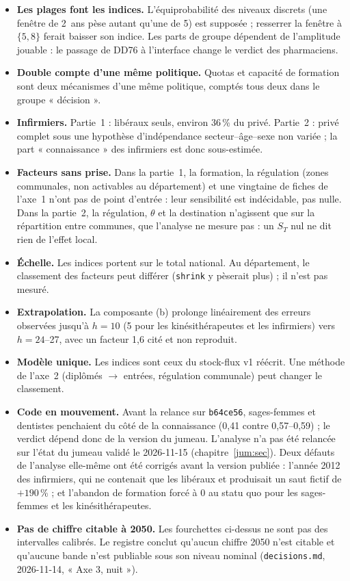 \begin{itemize}
  \item \textbf{Les plages font les indices.} L'équiprobabilité des niveaux discrets (une fenêtre de 2~ans pèse
        autant qu'une de 5) est supposée ; resserrer la fenêtre à $\{5, 8\}$ ferait baisser son indice. Les parts
        de groupe dépendent de l'amplitude jouable : le passage de DD76 à l'interface change le verdict des
        pharmaciens.
  \item \textbf{Double compte d'une même politique.} Quotas et capacité de formation sont deux mécanismes d'une même
        politique, comptés tous deux dans le groupe « décision ».
  \item \textbf{Infirmiers.} Partie~1 : libéraux seuls, environ 36\derive{}\,\% du privé. Partie~2 : privé complet
        sous une hypothèse d'indépendance secteur--âge--sexe non variée ; la part « connaissance » des infirmiers est
        donc sous-estimée.
  \item \textbf{Facteurs sans prise.} Dans la partie~1, la formation, la régulation (zones communales, non
        activables au département) et une vingtaine de fiches de l'axe~1 n'ont pas de point d'entrée : leur
        sensibilité est indécidable, pas nulle. Dans la partie~2, la régulation, $\theta$ et la destination n'agissent
        que sur la répartition entre communes, que l'analyse ne mesure pas : un $S_T$ nul ne dit rien de l'effet
        local.
  \item \textbf{Échelle.} Les indices portent sur le total national. Au département, le classement des facteurs
        peut différer (\texttt{shrink} y pèserait plus) ; il n'est pas mesuré.
  \item \textbf{Extrapolation.} La composante (b) prolonge linéairement des erreurs observées jusqu'à $h = 10$ (5 pour
        les kinésithérapeutes et les infirmiers) vers $h = 24$--27, avec un facteur 1,6 cité et non reproduit.
  \item \textbf{Modèle unique.} Les indices sont ceux du stock-flux v1 réécrit. Une méthode de l'axe~2 (diplômés
        $\to$ entrées, régulation communale) peut changer le classement.
  \item \textbf{Code en mouvement.} Avant la relance sur \texttt{b64ce56}, sages-femmes et dentistes penchaient du
        côté de la connaissance (0,41 contre 0,57--0,59\mesure{}) ; le verdict dépend donc de la version du jumeau.
        L'analyse n'a pas été relancée sur l'état du jumeau validé le 2026-11-15 (chapitre~\ref{jum:sec}). Deux
        défauts de l'analyse elle-même ont été corrigés avant la version publiée : l'année 2012 des infirmiers, qui
        ne contenait que les libéraux et produisait un saut fictif de $+190$\mesure{}\,\% ; et l'abandon de formation
        forcé à 0 au statu quo pour les sages-femmes et les kinésithérapeutes.
  \item \textbf{Pas de chiffre citable à 2050.} Les fourchettes ci-dessus ne sont pas des intervalles calibrés. Le
        registre conclut qu'aucun chiffre 2050 n'est citable et qu'aucune bande n'est publiable sous son niveau
        nominal (\texttt{decisions.md}, 2026-11-14, « Axe 3, nuit »).
\end{itemize}

